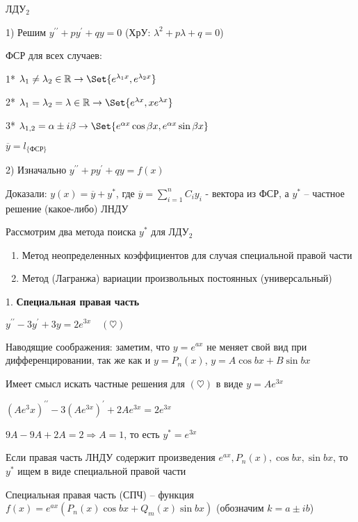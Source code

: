 \documentclass[12pt]{article}
\begin{document}
    \Mem ЛДУ$_2$

    1) Решим $y^{\prime\prime} + py^\prime + qy = 0$ (ХрУ: $\lambda^2 + p \lambda + q = 0$)

    ФСР для всех случаев:

    1* $\lambda_1 \neq \lambda_2 \in \Real \to \Set{e^{\lambda_1 x}, e^{\lambda_2 x}}$

    2* $\lambda_1 = \lambda_2 = \lambda \in \Real \to \Set{e^{\lambda x}, xe^{\lambda x}}$

    3* $\lambda_{1,2} = \alpha \pm i \beta \to \Set{e^{\alpha x} \cos \beta x, e^{\alpha x} \sin \beta x}$

    $\overline{y} = l_{\{\text{ФСР}\}}$

    2) Изначально $y^{\prime\prime} + py^\prime + qy = f(x)$

    Доказали: $y(x) = \overline{y} + y^*$, где $\overline{y} = \sum_{i=1}^n C_i y_i$ - вектора из ФСР, а $y^*$ -- частное решение (какое-либо) ЛНДУ

    \Nota Рассмотрим два метода поиска $y^*$ для ЛДУ$_2$

    \begin{enumerate}
        \item Метод неопределенных коэффициентов для случая специальной правой части

        \item Метод (Лагранжа) вариации произвольных постоянных (универсальный)
    \end{enumerate}

    \mediumvspace

    1. \textbf{Специальная правая часть}

    \Ex $y^{\prime\prime} - 3y^\prime + 3y = 2e^{3x} \quad (\heartsuit)$

    Наводящие соображения: заметим, что $y = e^{ax}$ не меняет свой вид при дифференцировании,
    так же как и $y = P_n(x)$, $y = A\cos bx + B\sin bx$

    Имеет смысл искать частные решения для $(\heartsuit)$ в виде $y = Ae^{3x}$

    $(Ae^3x)^{\prime\prime} - 3(Ae^{3x})^\prime + 2Ae^{3x} = 2e^{3x}$

    $9A - 9A + 2A = 2 \Longrightarrow A = 1$, то есть $y^* = e^{3x}$

    \Nota Если правая часть ЛНДУ содержит произведения $e^{ax}, P_n(x), \cos bx, \sin bx$, то $y^*$ ищем в виде специальной правой части

    \Def Специальная правая часть (СПЧ) -- функция $f(x) = e^{ax} (P_n(x)\cos bx + Q_m (x)\sin bx)$ (обозначим $k = a \pm ib$)
\end{document}
